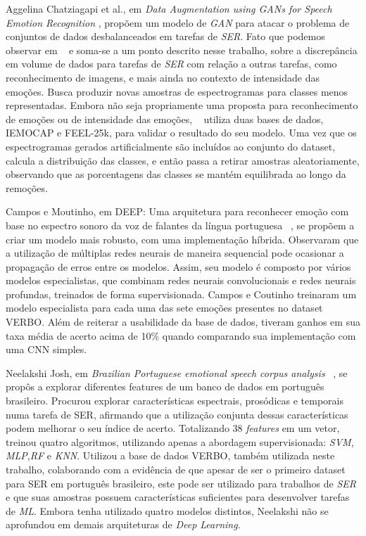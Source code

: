 Aggelina Chatziagapi et al., em \textit{Data Augmentation using GANs for Speech Emotion Recognition }\cite{32.89}, propõem um modelo de \textit{GAN} para atacar o problema de conjuntos de dados desbalanceados em tarefas de \textit{SER}. Fato que podemos observar em ~\cite{32.32} e soma-se a um ponto descrito nesse trabalho, sobre a discrepância em volume de dados para tarefas de \textit{SER} com relação a outras tarefas, como reconhecimento de imagens, e mais ainda no contexto de intensidade das emoções. Busca produzir novas amostras de espectrogramas para classes menos representadas. Embora não seja propriamente uma proposta para reconhecimento de emoções ou de intensidade das emoções, ~\cite{32.89} utiliza duas bases de dados, IEMOCAP e FEEL-25k, para validar o resultado do seu modelo. Uma vez que os espectrogramas gerados artificialmente são incluídos ao conjunto do dataset, calcula a distribuição das classes, e então passa a retirar amostras aleatoriamente, observando que as porcentagens das classes se mantém equilibrada ao longo da remoções.

Campos e Moutinho, em DEEP: Uma arquitetura para reconhecer emoção com base no espectro sonoro da voz de falantes da língua portuguesa ~\cite{12}, se propõem a criar um modelo mais robusto, com uma implementação híbrida. Observaram que a utilização de múltiplas redes neurais de maneira sequencial pode ocasionar a propagação de erros entre os modelos. Assim, seu modelo é composto por vários modelos especialistas, que combinam redes neurais convolucionais e redes neurais profundas, treinados de forma supervisionada. Campos e Coutinho treinaram um modelo especialista para cada uma das sete emoções presentes no dataset VERBO. Além de reiterar a usabilidade da base de dados, tiveram ganhos em sua taxa média de acerto acima de 10\% quando comparando sua implementação com uma CNN simples.

Neelakshi Josh, em \textit{Brazilian Portuguese emotional speech corpus analysis} ~\cite{20}, se propôs a explorar diferentes features de um banco de dados em português brasileiro. Procurou explorar características espectrais, prosódicas e temporais numa tarefa de SER, afirmando que a utilização conjunta dessas características podem melhorar o seu índice de acerto. Totalizando 38 \textit{features} em um vetor, treinou quatro algoritmos, utilizando apenas a abordagem supervisionada: \textit{SVM}, \textit{MLP},\textit{RF} e \textit{KNN}. Utilizou a base de dados VERBO, também utilizada neste trabalho, colaborando com a evidência de que apesar de ser o primeiro dataset para SER em português brasileiro, este pode ser utilizado para trabalhos de \textit{SER} e que suas amostras possuem características suficientes para desenvolver tarefas de \textit{ML}. Embora tenha utilizado quatro modelos distintos, Neelakshi não se aprofundou em demais arquiteturas de \textit{Deep Learning}.

